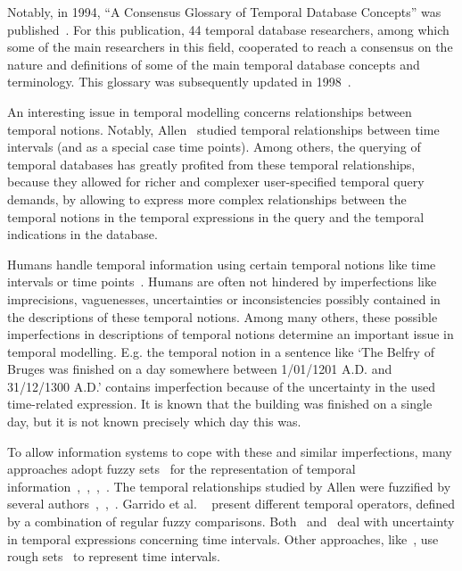 Notably, in 1994, ``A Consensus Glossary of Temporal Database Concepts'' was published~\cite{Dyreson1994}. For this publication, 44 temporal database researchers, among which some of the main researchers in this field, cooperated to reach a consensus on the nature and definitions of some of the main temporal database concepts and terminology. This glossary was subsequently updated in 1998~\cite{Jensen:Dyreson:1998:TheConsensusGlossary}.

An interesting issue in temporal modelling concerns relationships between temporal notions. Notably, Allen~\cite{Allen83} studied temporal relationships between time intervals (and as a special case time points). Among others, the querying of temporal databases has greatly profited from these temporal relationships, because they allowed for richer and complexer user-specified temporal query demands, by allowing to express more complex relationships between the temporal notions in the temporal expressions in the query and the temporal indications in the database.

Humans handle temporal information using certain temporal notions like time intervals or time points~\cite{Dyreson1994}. Humans are often not hindered by imperfections like imprecisions, vaguenesses, uncertainties or inconsistencies possibly contained in the descriptions of these temporal notions. Among many others, these possible imperfections in descriptions of temporal notions determine an important issue in temporal modelling. E.g. the temporal notion in a sentence like `The Belfry of Bruges was finished on a day somewhere between 1/01/1201 A.D. and 31/12/1300 A.D.' contains imperfection because of the uncertainty in the used time-related expression. It is known that the building was finished on a single day, but it is not known precisely which day this was.

To allow information systems to cope with these and similar imperfections, many approaches adopt fuzzy sets~\cite{Zadeh65} for the representation of temporal information~\cite{343607},~\cite{nagypal2003},~\cite{Billiet:Pons:Matthe:DeTre:Pons:2011:BipolarFuzzy},~\cite{Dubois:jucs_9_9:fuzziness_and_uncertainty_in}. The temporal relationships studied by Allen were fuzzified by several authors~\cite{ohlbach2004},~\cite{nagypal2003},~\cite{schockaert08}. Garrido et al. ~\cite{garrido2009} present different temporal operators, defined by a combination of regular fuzzy comparisons. Both~\cite{garrido2009} and~\cite{Pon11} deal with uncertainty in temporal expressions concerning time intervals. Other approaches, like~\cite{Qia09}, use rough sets~\cite{Pawlak1995} to represent time intervals.

